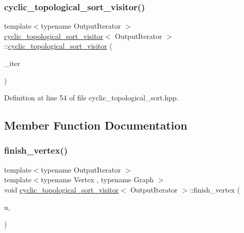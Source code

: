 \subsubsection{\texorpdfstring{cyclic\+\_\+topological\+\_\+sort\+\_\+visitor()}{cyclic\_topological\_sort\_visitor()}}
{\footnotesize\ttfamily template$<$typename Output\+Iterator $>$ \\
\hyperlink{structcyclic__topological__sort__visitor}{cyclic\+\_\+topological\+\_\+sort\+\_\+visitor}$<$ Output\+Iterator $>$\+::\hyperlink{structcyclic__topological__sort__visitor}{cyclic\+\_\+topological\+\_\+sort\+\_\+visitor} (\begin{DoxyParamCaption}\item[{Output\+Iterator}]{\+\_\+iter }\end{DoxyParamCaption})\hspace{0.3cm}{\ttfamily [inline]}}



Definition at line 54 of file cyclic\+\_\+topological\+\_\+sort.\+hpp.



\subsection{Member Function Documentation}
\mbox{\label{structcyclic__topological__sort__visitor_a8fb34e752238607d7213c50ae514dd3f}} 
\subsubsection{\texorpdfstring{finish\+\_\+vertex()}{finish\_vertex()}}
{\footnotesize\ttfamily template$<$typename Output\+Iterator $>$ \\
template$<$typename Vertex , typename Graph $>$ \\
void \hyperlink{structcyclic__topological__sort__visitor}{cyclic\+\_\+topological\+\_\+sort\+\_\+visitor}$<$ Output\+Iterator $>$\+::finish\+\_\+vertex (\begin{DoxyParamCaption}\item[{const Vertex \&}]{u,  }\item[{\hyperlink{structGraph}{Graph} \&}]{ }\end{DoxyParamCaption})\hspace{0.3cm}{\ttfamily [inline]}}



